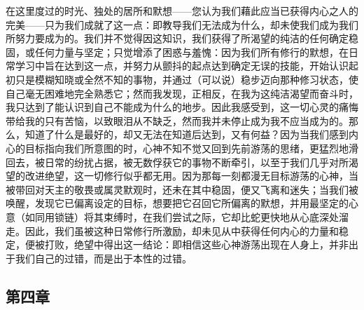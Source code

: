 在这里度过的时光、独处的居所和默想——您认为我们藉此应当已获得内心之人的完美——只为我们成就了这一点：即教导我们无法成为什么，却未使我们成为我们所努力要成为的。我们并不觉得因这知识，我们获得了所渴望的纯洁的任何确定稳固，或任何力量与坚定；只觉增添了困惑与羞愧：因为我们所有修行的默想，在日常学习中旨在达到这一点，并努力从颤抖的起点达到确定无误的技能，开始认识起初只是模糊知晓或全然不知的事物，并通过（可以说）稳步迈向那种修习状态，使自己毫无困难地完全熟悉它；然而我发现，正相反，在我为这纯洁渴望而奋斗时，我只达到了能认识到自己不能成为什么的地步。因此我感受到，这一切心灵的痛悔带给我的只有苦恼，以致眼泪从不缺乏，然而我并未停止成为我不应当成为的。那么，知道了什么是最好的，却又无法在知道后达到，又有何益？因为当我们感到内心的目标指向我们所意图的时，心神不知不觉又回到先前游荡的思绪，更猛烈地滑回去，被日常的纷扰占据，被无数俘获它的事物不断牵引，以至于我们几乎对所渴望的改进绝望，这一切修行似乎都无用。因为那每一刻都漫无目标游荡的心神，当被带回对天主的敬畏或属灵默观时，还未在其中稳固，便又飞离和迷失；当我们被唤醒，发现它已偏离设定的目标，想要把它召回它所偏离的默想，并用最坚定的心意（如同用锁链）将其束缚时，在我们尝试之际，它却比蛇更快地从心底深处溜走。因此，我们虽被这种日常修行所激励，却未见从中获得任何内心的力量和稳定，便被打败，绝望中得出这一结论：即相信这些心神游荡出现在人身上，并非出于我们自己的过错，而是出于本性的过错。\par


\subsection{第四章}

\par

